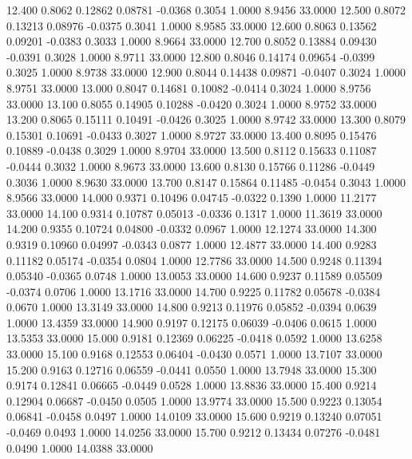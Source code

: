   12.400   0.8062   0.12862   0.08781  -0.0368   0.3054   1.0000   8.9456  33.0000
  12.500   0.8072   0.13213   0.08976  -0.0375   0.3041   1.0000   8.9585  33.0000
  12.600   0.8063   0.13562   0.09201  -0.0383   0.3033   1.0000   8.9664  33.0000
  12.700   0.8052   0.13884   0.09430  -0.0391   0.3028   1.0000   8.9711  33.0000
  12.800   0.8046   0.14174   0.09654  -0.0399   0.3025   1.0000   8.9738  33.0000
  12.900   0.8044   0.14438   0.09871  -0.0407   0.3024   1.0000   8.9751  33.0000
  13.000   0.8047   0.14681   0.10082  -0.0414   0.3024   1.0000   8.9756  33.0000
  13.100   0.8055   0.14905   0.10288  -0.0420   0.3024   1.0000   8.9752  33.0000
  13.200   0.8065   0.15111   0.10491  -0.0426   0.3025   1.0000   8.9742  33.0000
  13.300   0.8079   0.15301   0.10691  -0.0433   0.3027   1.0000   8.9727  33.0000
  13.400   0.8095   0.15476   0.10889  -0.0438   0.3029   1.0000   8.9704  33.0000
  13.500   0.8112   0.15633   0.11087  -0.0444   0.3032   1.0000   8.9673  33.0000
  13.600   0.8130   0.15766   0.11286  -0.0449   0.3036   1.0000   8.9630  33.0000
  13.700   0.8147   0.15864   0.11485  -0.0454   0.3043   1.0000   8.9566  33.0000
  14.000   0.9371   0.10496   0.04745  -0.0322   0.1390   1.0000  11.2177  33.0000
  14.100   0.9314   0.10787   0.05013  -0.0336   0.1317   1.0000  11.3619  33.0000
  14.200   0.9355   0.10724   0.04800  -0.0332   0.0967   1.0000  12.1274  33.0000
  14.300   0.9319   0.10960   0.04997  -0.0343   0.0877   1.0000  12.4877  33.0000
  14.400   0.9283   0.11182   0.05174  -0.0354   0.0804   1.0000  12.7786  33.0000
  14.500   0.9248   0.11394   0.05340  -0.0365   0.0748   1.0000  13.0053  33.0000
  14.600   0.9237   0.11589   0.05509  -0.0374   0.0706   1.0000  13.1716  33.0000
  14.700   0.9225   0.11782   0.05678  -0.0384   0.0670   1.0000  13.3149  33.0000
  14.800   0.9213   0.11976   0.05852  -0.0394   0.0639   1.0000  13.4359  33.0000
  14.900   0.9197   0.12175   0.06039  -0.0406   0.0615   1.0000  13.5353  33.0000
  15.000   0.9181   0.12369   0.06225  -0.0418   0.0592   1.0000  13.6258  33.0000
  15.100   0.9168   0.12553   0.06404  -0.0430   0.0571   1.0000  13.7107  33.0000
  15.200   0.9163   0.12716   0.06559  -0.0441   0.0550   1.0000  13.7948  33.0000
  15.300   0.9174   0.12841   0.06665  -0.0449   0.0528   1.0000  13.8836  33.0000
  15.400   0.9214   0.12904   0.06687  -0.0450   0.0505   1.0000  13.9774  33.0000
  15.500   0.9223   0.13054   0.06841  -0.0458   0.0497   1.0000  14.0109  33.0000
  15.600   0.9219   0.13240   0.07051  -0.0469   0.0493   1.0000  14.0256  33.0000
  15.700   0.9212   0.13434   0.07276  -0.0481   0.0490   1.0000  14.0388  33.0000

